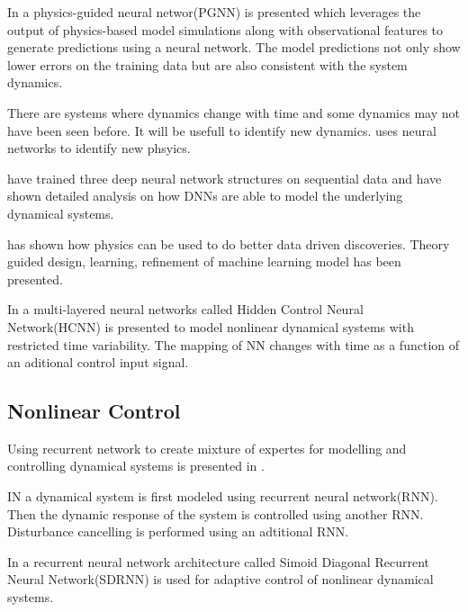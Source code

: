 \documentclass[conference]{IEEEtran}
\begin{document}
In \cite{karpatne2017nips, karpatne2017physics-guided} a physics-guided neural networ(PGNN) is presented which leverages the output of physics-based model simulations along with observational features to generate predictions using a neural network. The model predictions not only show lower errors on the training data but are also consistent with the system dynamics.

There are systems where dynamics change with time and some dynamics may not have been seen before. It will be usefull to identify new dynamics. \cite{d'agnolo2018learning} uses neural networks to identify new phsyics.

\cite{ogunmolu2016nonlinear} have trained three deep neural network structures on sequential data and have shown detailed analysis on how DNNs are able to model the underlying dynamical systems.

\cite{karpatne2017theory-guided} has shown how physics can be used to do better data driven discoveries. Theory guided design, learning, refinement of machine learning model has been presented.

In \cite{levin1991nips} a multi-layered neural networks called Hidden Control Neural Network(HCNN) is presented to model nonlinear dynamical systems with restricted time variability. The mapping of NN changes with time as a function of an aditional control input signal.


\subsection{Nonlinear Control}

\cite{timothy1994nips, plett2003nn, aboueldahab2011identification, milito1991nips, lippmann1991nips, scott1992nips, HBZnips96, takashi2005nonlinear, sabino1999chaos, sergey2011nips, schnider1997nips, doya1997nips, rawlik2010nips, emanuel2009nips, li2015dynamic, watter2015nips, jordan1990nips, rivals2000nn, brown1998ICDC, susemihl2014nips, Mozer1996TheNP, deng2008feedback, chen2002ICDC, timothy1994nips, yu1996nips}

Using recurrent network to create mixture of expertes for modelling and controlling dynamical systems is presented in \cite{timothy1994nips}.

IN \cite{plett2003nn} a dynamical system is first modeled using recurrent neural network(RNN). Then the dynamic response of the system is controlled using another RNN. Disturbance cancelling is performed using an adtitional RNN.

In \cite{aboueldahab2011identification} a recurrent neural network architecture called Simoid Diagonal Recurrent Neural Network(SDRNN) is used for adaptive control of nonlinear dynamical systems.
\end{document}
